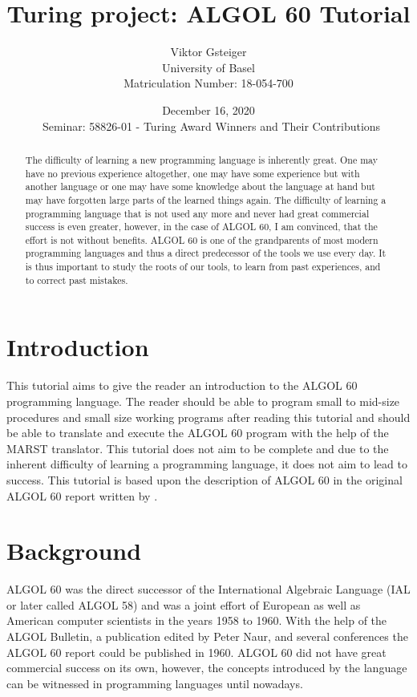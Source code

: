 \documentclass{article}
\author{Viktor Gsteiger \\ University of Basel \\ Matriculation Number: 18-054-700}
\title{Turing project: ALGOL 60 Tutorial}
\date{December 16, 2020 \\\ Seminar: 58826-01 - Turing Award Winners and Their Contributions}
\begin{document}
\maketitle

\begin{abstract}
	The difficulty of learning a new programming language is inherently great. One may have no previous experience altogether, one may have some experience but with another language or one may have some knowledge about the language at hand but may have forgotten large parts of the learned things again. The difficulty of learning a programming language that is not used any more and never had great commercial success is even greater, however, in the case of ALGOL 60, I am convinced, that the effort is not without benefits. ALGOL 60 is one of the grandparents of most modern programming languages and thus a direct predecessor of the tools we use every day. It is thus important to study the roots of our tools, to learn from past experiences, and to correct past mistakes.
\end{abstract}

\newpage

\tableofcontents

\newpage

\section{Introduction}
This tutorial aims to give the reader an introduction to the ALGOL 60 programming language. The reader should be able to program small to mid-size procedures and small size working programs after reading this tutorial and should be able to translate and execute the ALGOL 60 program with the help of the MARST translator. This tutorial does not aim to be complete and due to the inherent difficulty of learning a programming language, it does not aim to lead to success. This tutorial is based upon the description of ALGOL 60 in the original ALGOL 60 report written by \citet{backus1960report}.

\section{Background}
ALGOL 60 was the direct successor of the International Algebraic Language (IAL or later called ALGOL 58) and was a joint effort of European as well as American computer scientists in the years 1958 to 1960. With the help of the ALGOL Bulletin, a publication edited by Peter Naur, and several conferences the ALGOL 60 report could be published in 1960. ALGOL 60 did not have great commercial success on its own, however, the concepts introduced by the language can be witnessed in programming languages until nowadays.
\end{document}
